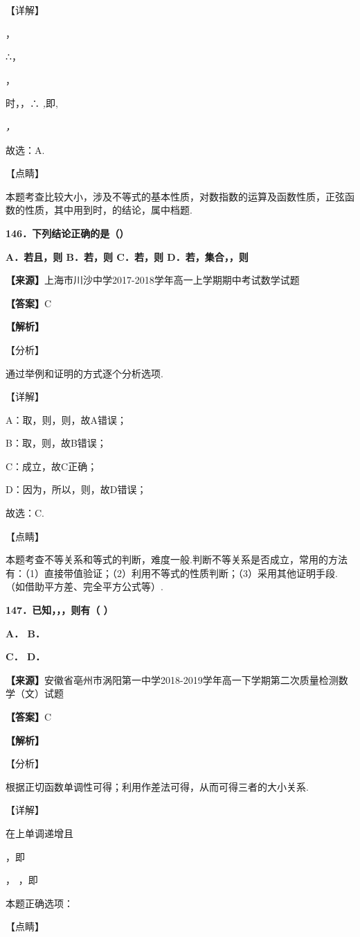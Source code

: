 【详解】

，

∴，

，

时，，∴ \emph{,}即,

\emph{，}

故选：A.

【点睛】

本题考查比较大小，涉及不等式的基本性质，对数指数的运算及函数性质，正弦函数的性质，其中用到时，的结论，属中档题.

\textbf{146．下列结论正确的是（）}

\textbf{A．若且，则 B．若，则 C．若，则 D．若，集合，，则}

\textbf{【来源】}上海市川沙中学2017-2018学年高一上学期期中考试数学试题

\textbf{【答案】}C

\textbf{【解析】}

【分析】

通过举例和证明的方式逐个分析选项.

【详解】

A：取，则，则，故A错误；

B：取，则，故B错误；

C：成立，故C正确；

D：因为，所以，则，故D错误；

故选：C.

【点睛】

本题考查不等关系和等式的判断，难度一般.判断不等关系是否成立，常用的方法有：（1）直接带值验证；（2）利用不等式的性质判断；（3）采用其他证明手段.（如借助平方差、完全平方公式等）.

\textbf{147．已知，，，则有（ ）}

\textbf{A． B．}

\textbf{C． D．}

\textbf{【来源】}安徽省亳州市涡阳第一中学2018-2019学年高一下学期第二次质量检测数学（文）试题

\textbf{【答案】}C

\textbf{【解析】}

【分析】

根据正切函数单调性可得；利用作差法可得，从而可得三者的大小关系.

【详解】

在上单调递增且

，即

， ，即

本题正确选项：

【点睛】

